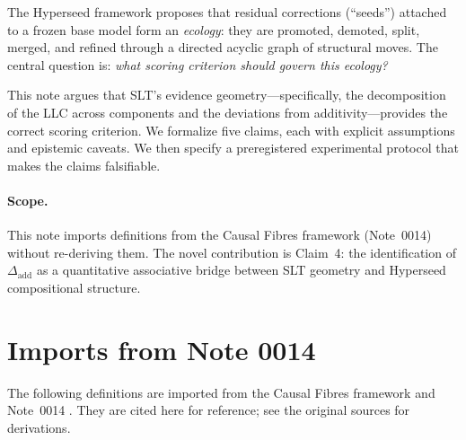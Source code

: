 \documentclass[11pt,a4paper]{article}
\theoremstyle{definition}
\theoremstyle{remark}
\newcommand{\Dadd}{\Delta_{\mathrm{add}}}
\begin{document}
The Hyperseed framework \cite{Weakness-SL,SLT-ResLayers} proposes that
residual corrections (``seeds'') attached to a frozen base model form an
\emph{ecology}: they are promoted, demoted, split, merged, and refined through
a directed acyclic graph of structural moves.  The central question is:
\emph{what scoring criterion should govern this ecology?}

This note argues that SLT's evidence geometry---specifically, the
decomposition of the LLC across components and the deviations from
additivity---provides the correct scoring criterion.  We formalize five claims,
each with explicit assumptions and epistemic caveats.  We then specify a
preregistered experimental protocol that makes the claims falsifiable.

\paragraph{Scope.}
This note imports definitions from the Causal Fibres framework (Note~0014)
\cite{CausalFibres,Note-0014} without re-deriving them.  The novel
contribution is Claim~4: the identification of $\Dadd$ as a quantitative
associative bridge between SLT geometry and Hyperseed compositional structure.

\section{Imports from Note 0014}\label{sec:imports}

The following definitions are imported from the Causal Fibres framework
\cite{CausalFibres} and Note~0014 \cite{Note-0014}.  They are cited here for
reference; see the original sources for derivations.
\end{document}
